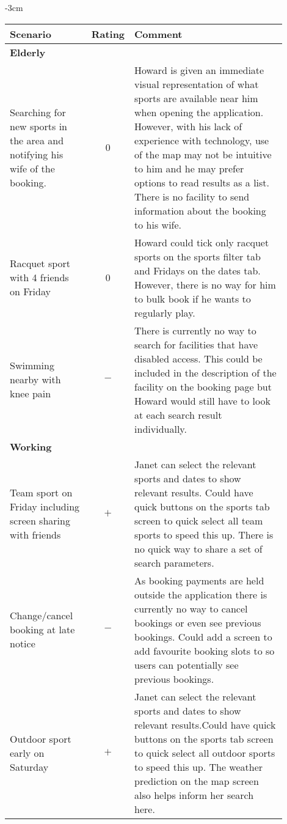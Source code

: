 \begin{center}
	\begin{adjustwidth*}{}{-3cm}
	\renewcommand{\arraystretch}{2}
	\begin{longtable}{@{\extracolsep{\fill}}p{0.3\linewidth} c p{0.6\linewidth}}
		\toprule
		\textbf{Scenario} & \textbf{Rating} & \textbf{Comment}\\
		\midrule
		\midrule
		\multicolumn{3}{l}{\textbf{Elderly}}\\
		\cmidrule(r){1-3}
		Searching for new sports in the area and notifying
		his wife of the booking. & 0 & Howard is given an immediate visual
		representation of what sports are available near him when opening the
		application. However, with his lack of experience with technology, use
		of the map may not be intuitive to him and he may prefer options to
		read results as a list. There is no facility to send information about
		the booking to his wife.\\

		Racquet sport with 4 friends on Friday & 0 & Howard could tick only
		racquet sports on the sports filter tab and Fridays on the dates tab.
		However, there is no way for him to bulk book if he wants to regularly
		play.\\

		Swimming nearby with knee pain & $-$ & There is currently no way to
		search for facilities that have disabled access. This could be included
		in the description of the facility on the booking page but Howard would
		still have to look at each search result individually.\\

		\midrule
		\multicolumn{3}{l}{\textbf{Working}}\\
		\cmidrule(r){1-3}
		Team sport on Friday including screen sharing with friends& $+$ & Janet
		can select the relevant sports and dates to show relevant results.
		Could have quick buttons on the sports tab screen to quick select all
		team sports to speed this up. There is no quick way to share a set of
		search parameters.\\

		Change/cancel booking at late notice & $-$ & As booking payments are
		held outside the application there is currently no way to cancel
		bookings or even see previous bookings. Could add a screen to add
		favourite booking slots to so users can potentially see previous
		bookings.\\

		Outdoor sport early on Saturday & $+$ & Janet can select the relevant
		sports and dates to show relevant results.Could have quick buttons on
		the sports tab screen to quick select all outdoor sports to speed this
		up. The weather prediction on the map screen also helps inform her
		search here.\\


\end{longtable}
\end{adjustwidth*}
\end{center}

